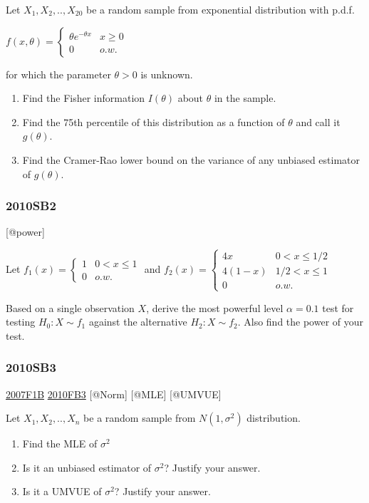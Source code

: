 \documentclass[6pt,twocolumn,Portrait]{article}
\begin{document}
Let \(X_1,X_2,..,X_{20}\) be a random sample from exponential
distribution with p.d.f.

\(f(x,\theta)=\begin{cases}\theta e^{-\theta x}& x\ge0\\0& o.w.\end{cases}\)

for which the parameter \(\theta>0\) is unknown.

\begin{enumerate}
\def\labelenumi{(\alph{enumi})}
\item
  Find the Fisher information \(I(\theta)\) about \(\theta\) in the
  sample.
\item
  Find the 75th percentile of this distribution as a function of
  \(\theta\) and call it \(g(\theta)\).
\item
  Find the Cramer-Rao lower bound on the variance of any unbiased
  estimator of \(g(\theta)\).
\end{enumerate}

\hypertarget{sb2-1}{%
\subsubsection{2010SB2}\label{sb2-1}}

{[}@power{]}

Let \(f_1(x)=\begin{cases}1&0<x\le1\\0& o.w.\end{cases}\) and
\(f_2(x)=\begin{cases}4x&0<x\le1/2\\4(1-x)& 1/2<x\le1\\0& o.w.\end{cases}\)

Based on a single observation \(X\), derive the most powerful level
\(\alpha=0.1\) test for testing \(H_0:X\sim f_1\) against the
alternative \(H_2:X\sim f_2\). Also find the power of your test.

\hypertarget{sb3-1}{%
\subsubsection{2010SB3}\label{sb3-1}}

\protect\hyperlink{f1b}{2007F1B} \protect\hyperlink{fb3-1}{2010FB3}
{[}@Norm{]} {[}@MLE{]} {[}@UMVUE{]}

Let \(X_1,X_2,..,X_n\) be a random sample from \(N(1,\sigma^2)\)
distribution.

\begin{enumerate}
\def\labelenumi{(\alph{enumi})}
\item
  Find the MLE of \(\sigma^2\)
\item
  Is it an unbiased estimator of \(\sigma^2\)? Justify your answer.
\item
  Is it a UMVUE of \(\sigma^2\)? Justify your answer.
\end{enumerate}
\end{document}

